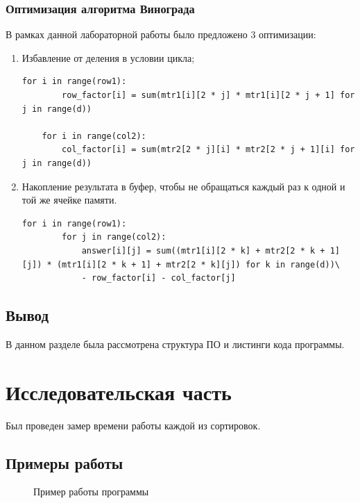 \documentclass[12pt]{report}
\begin{document}
\subsection{Оптимизация алгоритма Винограда}
В рамках данной лабораторной работы было предложено 3 оптимизации:
\begin{enumerate}
	\item Избавление от деления в условии цикла;
	\newpage
	\begin{lstlisting}[label=some-code,caption=Оптимизации алгоритма Винограда №1 и №2]
    for i in range(row1):
		row_factor[i] = sum(mtr1[i][2 * j] * mtr1[i][2 * j + 1] for j in range(d))

	for i in range(col2):
		col_factor[i] = sum(mtr2[2 * j][i] * mtr2[2 * j + 1][i] for j in range(d))

	\end{lstlisting}
	
	\item Накопление результата в буфер, чтобы не обращаться каждый раз к одной и той же ячейке памяти.
	\begin{lstlisting}[label=some-code,caption=Оптимизации алгоритма Винограда №3]
    for i in range(row1):
		for j in range(col2):
			answer[i][j] = sum((mtr1[i][2 * k] + mtr2[2 * k + 1][j]) * (mtr1[i][2 * k + 1] + mtr2[2 * k][j]) for k in range(d))\
			- row_factor[i] - col_factor[j]
	\end{lstlisting}
\end{enumerate}

\section{Вывод}
В данном разделе была рассмотрена структура ПО и листинги кода программы.

\chapter{Исследовательская часть}
Был проведен замер времени работы каждой из сортировок.
\section{Примеры работы}
\begin{figure}[h]
	\caption{Пример работы программы}
	\label{ris:example}
\end{figure}
\end{document}
